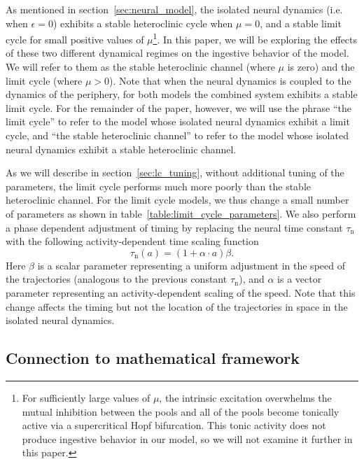 As mentioned in section~\ref{sec:neural_model}, the isolated neural dynamics
(i.e. when $\epsilon = 0$) exhibits a stable heteroclinic cycle when $\mu = 0$, and a
stable limit cycle for small positive values of $\mu$\footnote{For sufficiently
large values of $\mu$, the intrinsic excitation overwhelms the mutual
inhibition between the pools and all of the pools become tonically active
via a supercritical Hopf bifurcation.  This tonic activity does not produce
ingestive behavior in our model, so we will not examine it further in this
paper.}.  In this paper, we will be exploring the effects of these two
different dynamical regimes on the ingestive behavior of the model.  We will
refer to them as the stable heteroclinic channel (where $\mu$ is zero) and the
limit cycle (where $\mu > 0$).  Note that when the neural dynamics is coupled
to the dynamics of the periphery, for both models the combined system exhibits
a stable limit cycle.  For the remainder of the paper, however, we will use the
phrase ``the limit cycle'' to refer to the model whose isolated neural dynamics
exhibit a limit cycle, and ``the stable heteroclinic channel'' to refer to the
model whose isolated neural dynamics exhibit a stable heteroclinic channel.

As we will describe in section~\ref{sec:lc_tuning}, without additional
tuning of the parameters, the limit cycle performs much more poorly than the
stable heteroclinic channel.  For the limit cycle models, we thus change
a small number of parameters as shown in table~\ref{table:limit_cycle_parameters}.
We also perform a phase dependent adjustment
of timing by replacing the neural time constant $\tau_\textrm{n}$ with the following
activity-dependent time scaling function
\begin{equation}
    \label{eq:tau_n_func}
    \tau_\textrm{n}(a) = (1 + \alpha \cdot a) \beta.
\end{equation}
Here $\beta$ is a scalar parameter representing a uniform adjustment in the
speed of the trajectories (analogous to the previous constant
$\tau_\textrm{n}$), and $\alpha$ is a vector parameter representing an
activity-dependent scaling of the speed.  Note that this change affects the
timing but not the location of the trajectories in space in the isolated neural
dynamics.


\subsection{Connection to mathematical framework}

